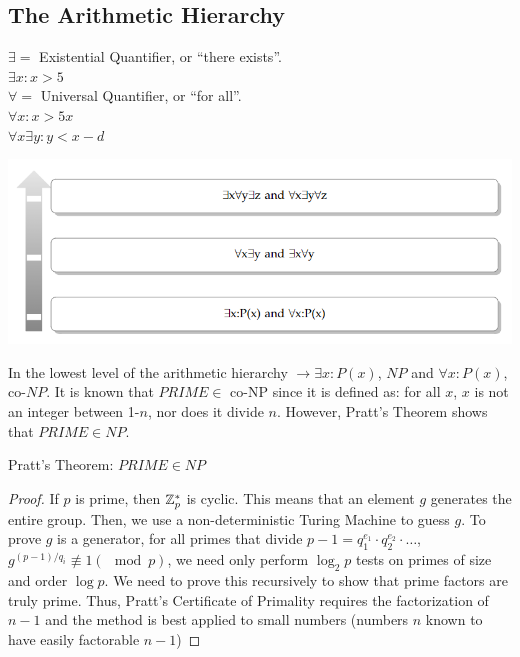 \subsection{The Arithmetic Hierarchy}
$\exists =$ Existential Quantiﬁer, or ``there exists''. \\
$\exists x: x>5$ \\
$\forall =$ Universal Quantiﬁer, or ``for all''. \\
$\forall x : x > 5x$ \\
$\forall x \exists y : y < x - d$
\begin{center}
    \includegraphics[scale=0.8]{figures/Arithmetic_Hierarchy.png}
\end{center}
In the lowest level of the arithmetic hierarchy $\to \exists x:P(x)$, 
$NP$ and $\forall x:P(x)$, co-$NP$. It is known that $PRIME \in$ co-NP since it is 
defined as: for all $x$, $x$ is
not an integer between 1-$n$, nor does it divide $n$. However, Pratt's Theorem
shows that $PRIME \in NP$.
\begin{theorem}
    Pratt's Theorem: $PRIME \in NP$
\end{theorem}
\begin{proof}
    If $p$ is prime, then $\mathbb{Z}_p^*$ is cyclic. This means that an element $g$
generates the entire group. Then, we use a non-deterministic Turing Machine
to guess $g$. To prove $g$ is a generator, for all primes that divide $p-1 =
q_1^{e_1} \cdot q_2^{e_2} \cdot \dots$, $g^{(p-1)/q_i} \not \equiv 1 (\mod p)$, 
we need only perform $\log_2 p$ tests on
primes of size and order $\log p$. We need to prove this recursively to show
that prime factors are truly prime. Thus, Pratt's Certiﬁcate of Primality requires
 the factorization of $n-1$ and the method is best applied to small
numbers (numbers $n$ known to have easily factorable $n - 1$)
\end{proof}
